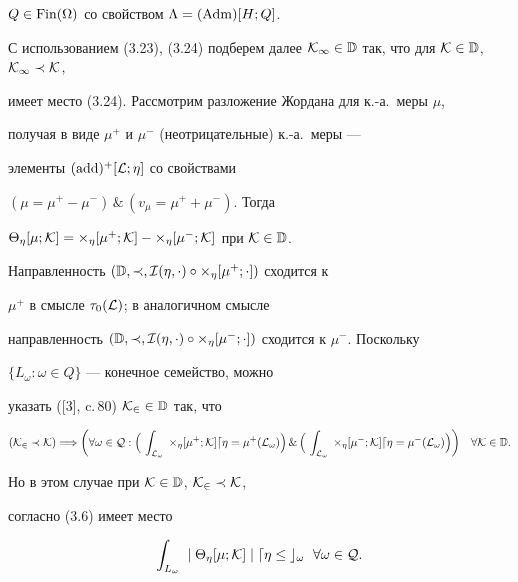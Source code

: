 \begin{pf}
$Q\in\operatorname{Fin}(\Omega)$ со свойством $\Lambda=(\operatorname{Adm})[H;Q]$.


С использованием (3.23), (3.24) подберем далее $\cal K_1\in


\Bbb D$ так, что для $\cal K\in\Bbb D$, $\cal K_1\prec\cal K$,


имеет место (3.24). Рассмотрим разложение Жордана для к.-а.~меры $\mu$,


получая в виде $\mu^+$ и $\mu^-$ (неотрицательные) к.-а.~меры ---


элементы $(\operatorname{add})^+[\cal L;\eta]$ со свойствами


$(\mu=\mu^+-\mu^-)\,\&\,(v_\mu=\mu^++\mu^-)$. Тогда


$\Theta_\eta[\mu;\cal K]=\Theta_\eta[\mu^+;\cal K]-


\Theta_\eta[\mu^-;\cal K]$ при $\cal K\in\Bbb D$.


Направленность $(\Bbb D,\prec,


\cal I(\eta,\cdot)\circ\Theta_\eta[\mu^+;\cdot])$ сходится к


$\mu^+$ в смысле $\tau_0(\cal L)$; в аналогичном смысле


направленность $(\Bbb D,\prec,\cal I(\eta,\cdot)\circ


\Theta_\eta[\mu^-;\cdot])$ сходится к $\mu^-$. Поскольку


$\{L_\omega:\omega \in Q\}$ --- конечное семейство, можно


указать ([3], c.\,80) $\cal K_2\in\Bbb D$ так, что


$$


(\cal K_2\prec\cal K)\Longrightarrow\bigg(\forall\omega\in Q:


\Big(\,\int_{L_\omega}\;\Theta_\eta[\mu^+;\cal K]d\eta=


\mu^+(L_\omega)\Big)\,\&\,


\Big(\,\int_{L_\omega}\;\Theta_\eta[\mu^-;\cal K]d\eta=


\mu^-(L_\omega)\Big)\bigg)\quad


\forall\cal K\in\Bbb D.


$$


Но в этом случае при $\cal K\in\Bbb D$, $\cal K_2\prec\cal K$,


согласно (3.6) имеет место 


\begin{equation}


\int_{L_\omega}\;\mid\Theta_\eta[\mu;\cal K]\mid d\eta\le


c_\omega\ \; \forall\omega\in Q.



\end{equation}
\end{pf}
